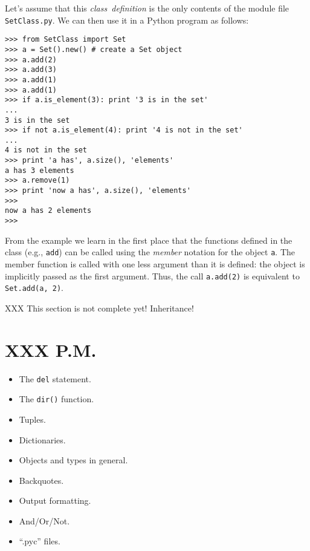Let's assume that this
{\em class\ definition}
is the only contents of the module file
{\tt SetClass.py}.
We can then use it in a Python program as follows:
\bcode\begin{verbatim}
>>> from SetClass import Set
>>> a = Set().new() # create a Set object
>>> a.add(2)
>>> a.add(3)
>>> a.add(1)
>>> a.add(1)
>>> if a.is_element(3): print '3 is in the set'
... 
3 is in the set
>>> if not a.is_element(4): print '4 is not in the set'
... 
4 is not in the set
>>> print 'a has', a.size(), 'elements'
a has 3 elements
>>> a.remove(1)
>>> print 'now a has', a.size(), 'elements'
>>> 
now a has 2 elements
>>> 
\end{verbatim}\ecode
From the example we learn in the first place that the functions defined
in the class (e.g.,
{\tt add})
can be called using the
{\em member}
notation for the object
{\tt a}.
The member function is called with one less argument than it is defined:
the object is implicitly passed as the first argument.
Thus, the call
{\tt a.add(2)}
is equivalent to
{\tt Set.add(a, 2)}.

XXX This section is not complete yet!  Inheritance!

\section{XXX P.M.}

\begin{itemize}
\item	The {\tt del} statement.
\item	The {\tt dir()} function.
\item	Tuples.
\item	Dictionaries.
\item	Objects and types in general.
\item	Backquotes.
\item	Output formatting.
\item	And/Or/Not.
\item	``.pyc'' files.
\end{itemize}


